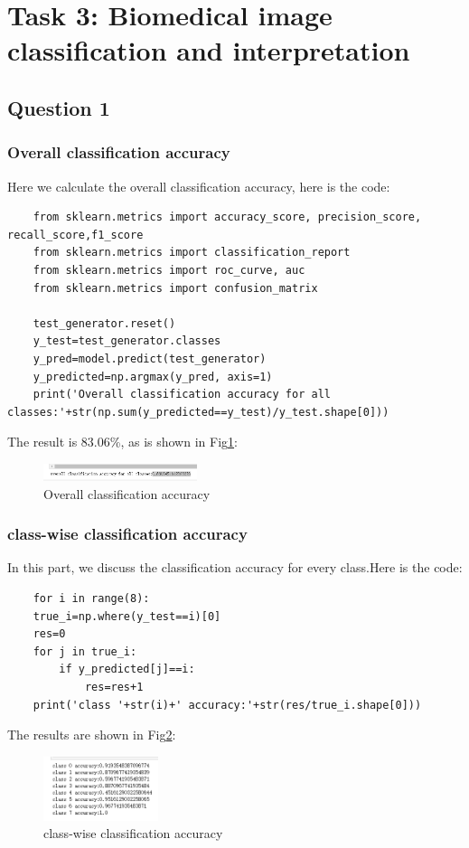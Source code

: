 \documentclass[conference]{IEEEtran}
\begin{document}
\section{Task 3: Biomedical image classification and interpretation}
\subsection{Question 1}
\subsubsection{Overall classification accuracy}
Here we calculate the overall classification accuracy, here is the code:
\begin{lstlisting}
    from sklearn.metrics import accuracy_score, precision_score, recall_score,f1_score
    from sklearn.metrics import classification_report
    from sklearn.metrics import roc_curve, auc
    from sklearn.metrics import confusion_matrix

    test_generator.reset()
    y_test=test_generator.classes
    y_pred=model.predict(test_generator)
    y_predicted=np.argmax(y_pred, axis=1)
    print('Overall classification accuracy for all classes:'+str(np.sum(y_predicted==y_test)/y_test.shape[0]))
\end{lstlisting}
The result is 83.06\%, as is shown in Fig\ref{Fig.t3q1}:
\begin{figure}[h] 
    \centering
    \includegraphics[width=0.4\textwidth]{T3Q1a.png}
    \caption{Overall classification accuracy}
    \label{Fig.t3q1}
\end{figure}
\subsubsection{class-wise classification accuracy}
In this part, we discuss the classification accuracy for every class.Here is the code:
\begin{lstlisting}
    for i in range(8):
    true_i=np.where(y_test==i)[0]
    res=0
    for j in true_i:
        if y_predicted[j]==i:
            res=res+1
    print('class '+str(i)+' accuracy:'+str(res/true_i.shape[0]))
\end{lstlisting}
The results are shown in Fig\ref{Fig.t3q2}:
\begin{figure}[h] 
    \centering
    \includegraphics[width=0.3\textwidth]{T3Q1b.png}
    \caption{class-wise classification accuracy} 
    \label{Fig.t3q2} 
\end{figure}
\end{document}

